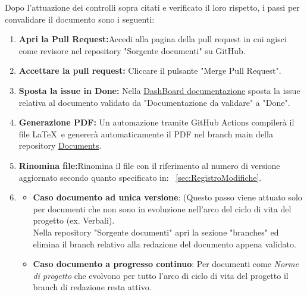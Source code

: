 \documentclass{article}
\begin{document}
Dopo l'attuazione dei controlli sopra citati e verificato il loro rispetto, i passi per convalidare il documento sono i seguenti:
\begin{enumerate}
 \item \textbf{Apri la Pull Request:}Accedi alla pagina della pull request in cui agisci come revisore nel repository "Sorgente documenti" su GitHub.
    \item \textbf{Accettare la pull request:} Cliccare il pulsante "Merge Pull Request".
     \item \textbf{Sposta la issue in Done:} Nella \href{https://github.com/orgs/ByteOps-swe/projects/1/views/1}{DashBoard documentazione} sposta la issue relativa al documento validato da "Documentazione da validare" a "Done".
     \item \textbf{Generazione PDF:} Un automazione tramite GitHub Actions compilerà il file   \LaTeX\ e genererà automaticamente il PDF nel branch main della repository \href{https://github.com/ByteOps-swe/Documents}{Documents}. 
     \item \textbf{Rinomina file:}Rinomina il file con il riferimento al numero di versione aggiornato secondo quanto specificato in: ~\ref{sec:RegistroModifiche}.
     \item \begin{itemize} \item \textbf{Caso documento ad unica versione}:
      (Questo passo viene attuato solo per documenti che non sono in evoluzione nell'arco del ciclo di vita del progetto (ex. Verbali).\\Nella repository "Sorgente documenti" apri la sezione "branches" ed elimina il branch relativo alla redazione del documento appena validato.
    
      \item \textbf{Caso documento a progresso continuo}: Per documenti come \textit{Norme di progetto} che evolvono per tutto l'arco di ciclo di vita del progetto il branch di redazione resta attivo. 
    \end{itemize}
     
\end{enumerate}

\end{document}
